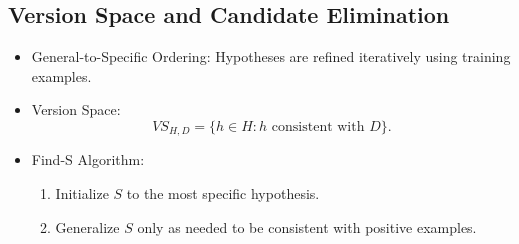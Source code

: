 \documentclass[10pt,a4paper]{article}
\begin{document}
\subsection*{Version Space and Candidate Elimination}
\begin{itemize}
	\item General-to-Specific Ordering: Hypotheses are refined iteratively using training examples.
	\item Version Space:
	\[
	VS_{H,D} = \{ h \in H : h \text{ consistent with } D \}.
	\]
	\item Find-S Algorithm:
	\begin{enumerate}
		\item Initialize \( S \) to the most specific hypothesis.
		\item Generalize \( S \) only as needed to be consistent with positive examples.
	\end{enumerate}
\end{itemize}
\end{document}
